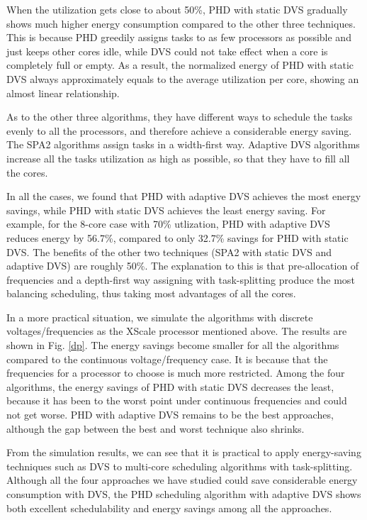 \documentclass[12pt, journal,compsoc]{IEEEtran}
\begin{document}
When the utilization gets close to about 50\%, PHD with static DVS gradually shows much higher energy consumption compared to the other three techniques. This is because PHD greedily assigns tasks to as few processors as possible and just keeps other cores idle, while DVS could not take effect when a core is completely full or empty. As a result, the normalized energy of PHD with static DVS always approximately equals to the average utilization per core, showing an almost linear relationship.



As to the other three algorithms, they have different ways to schedule the tasks evenly to all the processors, and therefore achieve a considerable energy saving. The SPA2 algorithms assign tasks in a width-first way. Adaptive DVS algorithms increase all the tasks utilization as high as possible, so that they have to fill all the cores.

In all the cases, we found that PHD with adaptive DVS achieves the most energy savings, while PHD with static DVS achieves the least energy saving. For example, for the 8-core case with 70\% utlization, PHD with adaptive DVS reduces energy by 56.7\%, compared to only 32.7\% savings for PHD with static DVS. The benefits of the other two techniques (SPA2 with static DVS and adaptive DVS) are roughly 50\%.
The explanation to this is that pre-allocation of frequencies and a depth-first way assigning with task-splitting produce the most balancing scheduling, thus taking most advantages of all the cores.

In a more practical situation, we simulate the algorithms with discrete voltages/frequencies as the XScale processor mentioned above. The results are shown in Fig. \ref{dp}. The energy savings become smaller for all the algorithms compared to the continuous voltage/frequency case. It is because that the frequencies for a processor to choose is much more restricted. Among the four algorithms, the energy savings of PHD with static DVS decreases the least, because it has been to the worst point under continuous frequencies and could not get worse. PHD with adaptive DVS remains to be the best approaches, although the gap between the best and worst technique also shrinks.


\vspace{0.1in}

From the simulation results, we can see that it is practical to apply energy-saving techniques such as DVS to multi-core scheduling algorithms with task-splitting. Although all the four approaches we have studied could save considerable energy consumption with DVS, the PHD scheduling algorithm with adaptive DVS shows both excellent schedulability and energy savings among all the approaches.
\end{document}
